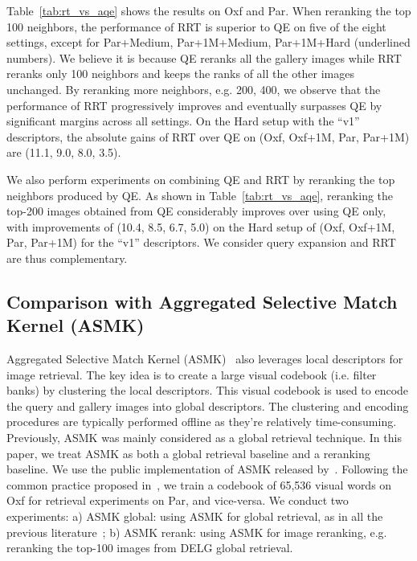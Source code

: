 Table~\ref{tab:rt_vs_aqe} shows the results on Oxf and Par.
When reranking the top 100 neighbors, the performance of RRT is superior to QE on five of the eight settings, except for Par+Medium, Par+1M+Medium, Par+1M+Hard (underlined numbers).
We believe it is because QE reranks all the gallery images while RRT reranks only 100 neighbors and keeps the ranks of all the other images unchanged.
By reranking more neighbors, e.g. 200, 400, we observe that the performance of RRT progressively improves and eventually surpasses QE by significant margins across all settings.
On the Hard setup with the ``v1'' descriptors, the absolute gains of RRT over QE on (Oxf, Oxf+1M, Par, Par+1M) are (11.1, 9.0, 8.0, 3.5).

We also perform experiments on combining QE and RRT by reranking the top neighbors produced by QE.
As shown in Table~\ref{tab:rt_vs_aqe}, reranking the top-200 images obtained from QE considerably improves over using QE only, with improvements of (10.4, 8.5, 6.7, 5.0) on the Hard setup of (Oxf, Oxf+1M, Par, Par+1M) for the ``v1'' descriptors.
We consider query expansion and RRT are thus complementary.



\subsection{Comparison with Aggregated Selective Match Kernel (ASMK)}

Aggregated Selective Match Kernel (ASMK)~\cite{asmk2016} also leverages local descriptors for image retrieval. 
The key idea is to create a large visual codebook (i.e. filter banks) by clustering the local descriptors.
This visual codebook is used to encode the query and gallery images into global descriptors. 
The clustering and encoding procedures are typically performed offline as they're relatively time-consuming.
Previously, ASMK was mainly considered as a global retrieval technique. 
In this paper, we treat ASMK as both a global retrieval baseline and a reranking baseline.
We use the public implementation of ASMK released by~\cite{rasmk2019}.
Following the common practice proposed in~\cite{rasmk2019}, we train a codebook of 65,536 visual words on Oxf for retrieval experiments on Par, and vice-versa. 
We conduct two experiments: a) ASMK global: using ASMK for global retrieval, as in all the previous literature~\cite{asmk2016, rasmk2019, how2020}; b) ASMK rerank: using ASMK for image reranking, e.g. reranking the top-100 images from DELG global retrieval. 

